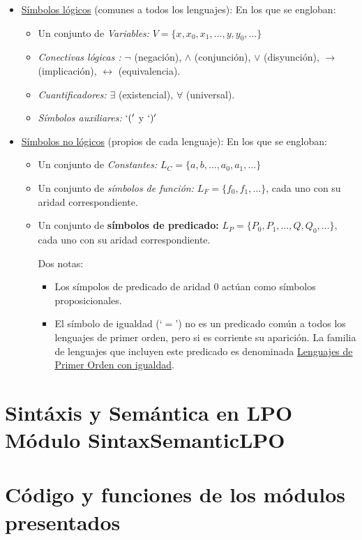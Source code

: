 \documentclass[a4paper]{report}
\begin{document}
\begin{itemize}
\item \underline{Símbolos lógicos} (comunes a todos los lenguajes): En los que se engloban:
\begin{itemize}
\item Un conjunto de \textit{Variables:} $V = \{x, x_0, x_1, \ldots, y, y_0, \ldots \}$
\item \textit{Conectivas lógicas :} $\neg$ (negación), $\wedge$ (conjunción), $\vee$ (disyunción), $\rightarrow$ (implicación), $\leftrightarrow$ (equivalencia).
\item \textit{Cuantificadores:} $\exists$ (existencial), $\forall$ (universal).
\item \textit{Símbolos auxiliares:} $`('$ y $`)'$
\end{itemize}
\item \underline{Símbolos no lógicos} (propios de cada lenguaje): En los que se engloban:
\begin{itemize}
\item Un conjunto de \textit{Constantes:} $L_{C}= \{a, b, \ldots, a_{0}, a_{1}, \ldots \}$
\item Un conjunto de \textit{símbolos de función:} $L_{F} = \{f_{0}, f_{1}, \ldots\}$, cada uno con su aridad correspondiente.
\item Un conjunto de \textbf{símbolos de predicado:} $L_P=\{P_{0}, P_{1}, \ldots, Q, Q_0, \ldots\}$, cada uno con su aridad correspondiente. 

Dos notas:
\begin{itemize}
\item Los símpolos de predicado de aridad 0 actúan como símbolos proposicionales.
\item El símbolo de igualdad (`$=$') no es un predicado común a todos los lenguajes de primer orden, pero si es corriente su aparición. La familia de lenguajes que incluyen este predicado es denominada \underline{Lenguajes de Primer Orden con igualdad}.
\end{itemize}
\end{itemize}
\end{itemize}

\section{Sintáxis y Semántica en LPO Módulo SintaxSemanticLPO}
\toDo

\section{Código y funciones de los módulos presentados}
\end{document}

